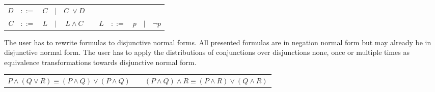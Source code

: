 \begin{center}
\begin{tabular}{rccccp{1cm}rcccl}
$D$	&$::=$ & $C$ 	&$|$ & $C \;\vee D$\\
$C$	&$::=$ & $L$ 	&$|$ & $L \wedge C$ &&
$L$	&$::=$ & $p$ 	&$|$ & $\neg p$
\end{tabular}
\end{center}

The user has to rewrite formulas to disjunctive normal forms. 
All presented formulas are in negation normal form 
but may already be in disjunctive normal form.
The user has to apply the distributions of conjunctions over disjunctions 
none, once or multiple times as
equivalence transformations towards disjunctive normal form.


\begin{center}
\begin{tabular}{cp{5mm}c}
$P \wedge (Q \vee R) \equiv (P\wedge Q) \vee (P\wedge Q)$ 			& &
$(P \wedge Q) \wedge R \equiv (P\wedge R) \vee (Q\wedge R)$
\end{tabular}
\end{center}



%
%
%
%
%

